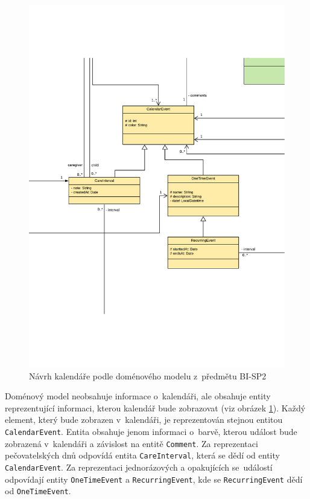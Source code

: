         \begin{figure}\centering
	        \includegraphics[width=1.0\textwidth]{pdfs/CalendarInfo1}
	        \caption[Předešlý návrh kalendáře]{Návrh kalendáře podle doménového modelu z~předmětu BI-SP2}\label{image:calendar-info}
        \end{figure}
        Doménový model neobsahuje informace o~kalendáři, ale obsahuje entity reprezentující informaci, kterou kalendář bude zobrazovat (viz obrázek \ref{image:calendar-info}). Každý element, který bude zobrazen v~kalendáři, je reprezentován stejnou entitou \verb|CalendarEvent|. Entita obsahuje jenom informaci o~barvě, kterou událost bude zobrazená v~kalendáři a závislost na entitě \verb|Comment|. Za reprezentaci pečovatelských dnů odpovídá entita \verb|CareInterval|, která se dědí od entity \verb|CalendarEvent|. Za reprezentaci jednorázových a opakujících se~událostí odpovídají entity \verb|OneTimeEvent| a \verb|RecurringEvent|, kde se \verb|RecurringEvent| dědí od \verb|OneTimeEvent|.
        
